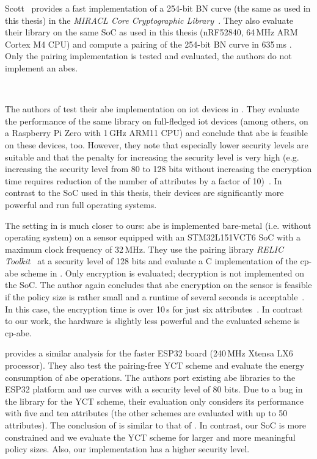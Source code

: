Scott~\cite{scott_deployment_2020} provides a fast implementation of a 254-bit BN curve (the same as used in this thesis) in the \emph{MIRACL Core Cryptographic Library}~\cite{scott_miracl_nodate}.
They also evaluate their library on the same SoC as used in this thesis (nRF52840, 64\,MHz ARM Cortex M4 CPU) and compute a pairing of the 254-bit BN curve in 635\,ms \cite[Table~4]{scott_deployment_2020}.
Only the pairing implementation is tested and evaluated, the authors do not implement an \acrshort{abes}.

~

The authors of \cite{ambrosin_feasibility_2015} test their \acrshort{abe} implementation on \gls{iot} devices in \cite{ambrosin_feasibility_2016}.
They evaluate the performance of the same library on full-fledged \acrshort{iot} devices (among others, on a Raspberry Pi Zero with 1\,GHz ARM11 CPU) and conclude that \acrshort{abe} is feasible on these devices, too.
However, they note that especially lower security levels are suitable and that the penalty for increasing the security level is very high (e.g. increasing the security level from 80 to 128 bits without increasing the encryption time requires reduction of the number of attributes by a factor of 10)~\cite{ambrosin_feasibility_2016}.
In contrast to the SoC used in this thesis, their devices are significantly more powerful and run full operating systems.

The setting in \cite{borgh_attribute-based_2016} is much closer to ours: \acrshort{abe} is implemented bare-metal (i.e. without operating system) on a sensor equipped with an STM32L151VCT6 SoC with a maximum clock frequency of 32\,MHz.
They use the pairing library \emph{RELIC Toolkit}~\cite{aranha_relic_nodate} at a security level of 128 bits and evaluate a C implementation of the \acrshort{cp-abe} scheme in \cite{waters_ciphertext-policy_2011}.
Only encryption is evaluated; decryption is not implemented on the SoC.
The author again concludes that \acrshort{abe} encryption on the sensor is feasible if the policy size is rather small and a runtime of several seconds is acceptable~\cite{borgh_attribute-based_2016}.
In this case, the encryption time is over 10\,s for just six attributes~\cite{borgh_attribute-based_2016}.
In contrast to our work, the hardware is slightly less powerful and the evaluated scheme is \acrshort{cp-abe}.

\cite{girgenti_feasibility_2019} provides a similar analysis for the faster ESP32 board (240\,MHz Xtensa LX6 processor).
They also test the pairing-free YCT scheme \cite{yao_lightweight_2015} and evaluate the energy consumption of \acrshort{abe} operations.
The authors port existing \acrshort{abe} libraries to the ESP32 platform and use curves with a security level of 80 bits.
Due to a bug in the library for the YCT scheme, their evaluation only considers its performance with five and ten attributes (the other schemes are evaluated with up to 50 attributes).
The conclusion of \cite{girgenti_feasibility_2019} is similar to that of \cite{borgh_attribute-based_2016}. 
In contrast, our SoC is more constrained and we evaluate the YCT scheme for larger and more meaningful policy sizes.
Also, our implementation has a higher security level.